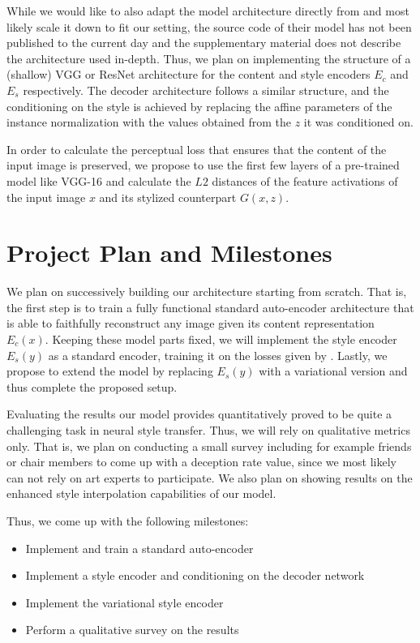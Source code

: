 \documentclass[twoside,twocolumn]{article}
\begin{document}
While we would like to also adapt the model architecture directly from \cite{Kotovenko_2019_ICCV} and most likely scale it down to fit our setting, the source code of their model has not been published to the current day and the supplementary material does not describe the architecture used in-depth. Thus, we plan on implementing the structure of a (shallow) VGG or ResNet architecture for the content and style encoders $E_c$ and $E_s$ respectively. The decoder architecture follows a similar structure, and the conditioning on the style is achieved by replacing the affine parameters of the instance normalization with the values obtained from the $z$ it was conditioned on.

In order to calculate the perceptual loss that ensures that the content of the input image is preserved, we propose to use the first few layers of a pre-trained model like VGG-16 and calculate the $L2$ distances of the feature activations of the input image $x$ and its stylized counterpart $G(x, z)$.

\section{Project Plan and Milestones}

We plan on successively building our architecture starting from scratch. That is, the first step is to train a fully functional standard auto-encoder architecture that is able to faithfully reconstruct any image given its content representation $E_c(x)$. Keeping these model parts fixed, we will implement the style encoder $E_s(y)$ as a standard encoder, training it on the losses given by \cite{Kotovenko_2019_ICCV}. Lastly, we propose to extend the model by replacing $E_s(y)$ with a variational version and thus complete the proposed setup.

Evaluating the results our model provides quantitatively proved to be quite a challenging task in neural style transfer. Thus, we will rely on qualitative metrics only. That is, we plan on conducting a small survey including for example friends or chair members to come up with a deception rate value, since we most likely can not rely on art experts to  participate. We also plan on showing results on the enhanced style interpolation capabilities of our model.

Thus, we come up with the following milestones:
\begin{itemize}
	\item Implement and train a standard auto-encoder
	\item Implement a style encoder and conditioning on the decoder network
	\item Implement the variational style encoder
	\item Perform a qualitative survey on the results
\end{itemize}
\end{document}
